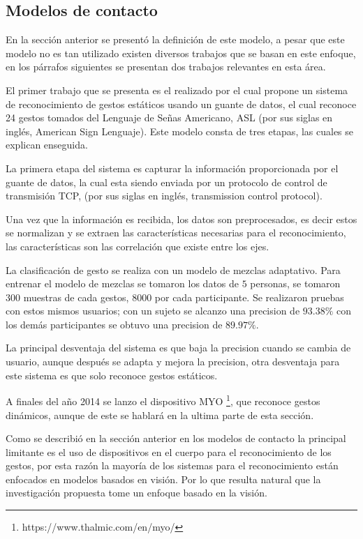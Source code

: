 \subsection{Modelos de contacto}
 
En la sección anterior se presentó la definición de este modelo, a pesar que este modelo no es tan utilizado existen diversos trabajos que se basan en este enfoque, en los párrafos siguientes se presentan dos trabajos relevantes en esta área. 

El primer trabajo que se presenta es el realizado por \citep{Yoon2012} el cual propone un sistema de reconocimiento de gestos estáticos usando un guante de datos, el cual reconoce 24 gestos tomados del Lenguaje de Señas Americano, ASL (por sus siglas en inglés, American Sign Lenguaje). Este modelo consta de tres etapas, las cuales se explican enseguida. 

La primera etapa del sistema es capturar la información proporcionada por el guante de datos, la cual esta siendo enviada por un protocolo de control de transmisión TCP, (por sus siglas en inglés, transmission control protocol). 
 
Una vez que la información es recibida, los datos son preprocesados, es decir estos se normalizan y se extraen las características necesarias para el reconocimiento, las características son las correlación que existe entre los ejes.    
 
La clasificación de gesto se realiza con un modelo de mezclas adaptativo. Para entrenar el modelo de mezclas se tomaron los datos de $5$ personas, se tomaron $300$ muestras de cada gestos, $8000$ por cada participante. Se realizaron pruebas con estos mismos usuarios; con un sujeto se alcanzo una precision de $93.38 \%$ con los demás participantes se obtuvo una precision de $89.97  \%$.  

La principal desventaja del sistema es que baja la precision cuando se cambia de usuario, aunque después se adapta y mejora la precision, otra desventaja para este sistema es que solo reconoce gestos estáticos. 

A finales del año 2014 se lanzo el dispositivo MYO \footnote{https://www.thalmic.com/en/myo/}, que reconoce gestos dinámicos, aunque de este se hablar\'a en la ultima parte de esta sección. 

Como se describi\'o en la sección anterior en los modelos de contacto la principal limitante es el uso de dispositivos en el cuerpo para el reconocimiento de los gestos, por esta razón la mayor\'ia de los sistemas para el reconocimiento están enfocados en modelos basados en visión. Por lo que resulta natural que la investigación propuesta tome un enfoque basado en la visión.

